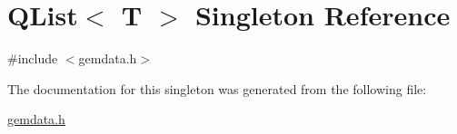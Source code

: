 \hypertarget{singleton_q_list}{\section{Q\+List$<$ T $>$ Singleton Reference}
\label{singleton_q_list}
}


{\ttfamily \#include $<$gemdata.\+h$>$}



The documentation for this singleton was generated from the following file\+:\begin{DoxyCompactItemize}
\item 
\hyperlink{gemdata_8h}{gemdata.\+h}\end{DoxyCompactItemize}
